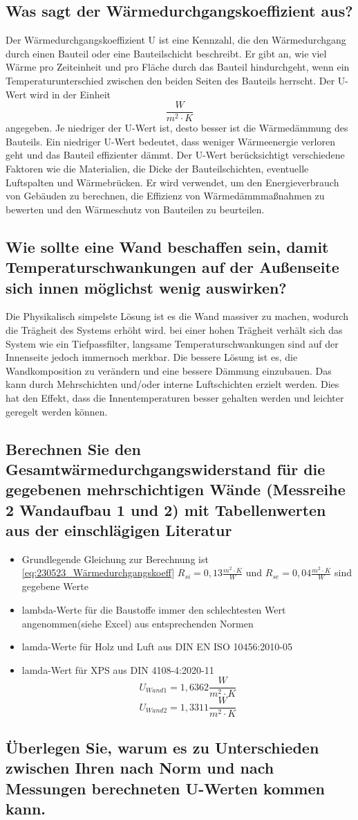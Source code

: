 \subsection{Was sagt der Wärmedurchgangskoeffizient aus?}
Der Wärmedurchgangskoeffizient U ist eine Kennzahl, die den Wärmedurchgang durch einen Bauteil oder eine Bauteilschicht beschreibt. 
Er gibt an, wie viel Wärme pro Zeiteinheit und pro Fläche durch das Bauteil hindurchgeht, wenn ein Temperaturunterschied zwischen den beiden Seiten des Bauteils herrscht.
Der U-Wert wird in der Einheit $$\frac{W}{m^2 \cdot K}$$ angegeben. Je niedriger der U-Wert ist, desto besser ist die Wärmedämmung des Bauteils. 
Ein niedriger U-Wert bedeutet, dass weniger Wärmeenergie verloren geht und das Bauteil effizienter dämmt.
Der U-Wert berücksichtigt verschiedene Faktoren wie die Materialien, die Dicke der Bauteilschichten, eventuelle Luftspalten und Wärmebrücken. 
Er wird verwendet, um den Energieverbrauch von Gebäuden zu berechnen, die Effizienz von Wärmedämmmaßnahmen zu bewerten und den Wärmeschutz von Bauteilen zu beurteilen.
\subsection{Wie sollte eine Wand beschaffen sein, damit Temperaturschwankungen auf der Außenseite sich innen möglichst wenig auswirken?}
Die Physikalisch simpelste Lösung ist es die Wand massiver zu machen, wodurch die Trägheit des Systems erhöht wird.
bei einer hohen Trägheit verhält sich das System wie ein Tiefpassfilter, langsame Temperaturschwankungen sind auf der Innenseite jedoch immernoch merkbar.
Die bessere Lösung ist es, die Wandkomposition zu verändern und eine bessere Dämmung einzubauen.
Das kann durch Mehrschichten und/oder interne Luftschichten erzielt werden.
Dies hat den Effekt, dass die Innentemperaturen besser gehalten werden und leichter geregelt werden können.

\subsection{Berechnen Sie den Gesamtwärmedurchgangswiderstand für die gegebenen mehrschichtigen Wände (Messreihe 2 Wandaufbau 1 und 2) mit Tabellenwerten aus der einschlägigen Literatur}
\begin{itemize}
\item Grundlegende Gleichung zur Berechnung ist \autoref{eq:230523_Wärmedurchgangskoeff} $R_{si}=0,13\frac{m^2 \cdot K}{W}$ und $R_{se}=0,04\frac{m^2 \cdot K}{W}$ sind gegebene Werte
\item lambda-Werte für die Baustoffe immer den schlechtesten Wert angenommen(siehe Excel) aus entsprechenden Normen
\item lamda-Werte für Holz \cite[S.20]{lamda-holz-luft} und Luft\cite[S. 15]{lamda-holz-luft} aus DIN EN ISO 10456:2010-05
\item lamda-Wert für XPS \cite[S.23]{lamda-xps} aus DIN 4108-4:2020-11
$$U_{Wand 1}=1,6362 \frac{W}{m^2 \cdot K}$$
$$U_{Wand 2}=1,3311 \frac{W}{m^2 \cdot K}$$
\end{itemize}


\subsection{Überlegen Sie, warum es zu Unterschieden zwischen Ihren nach Norm und nach Messungen berechneten U-Werten kommen kann.}
